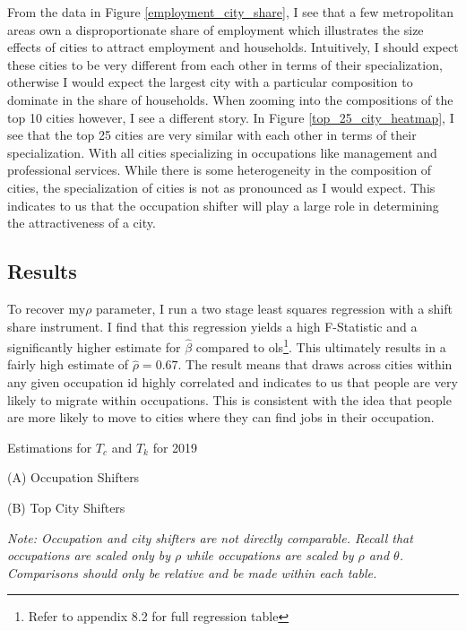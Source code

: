 \documentclass[10pt]{article}
\begin{document}
From the data in Figure \ref{employment_city_share}, I see that a few metropolitan areas own a disproportionate share of employment which illustrates the size effects of cities to attract employment and households. Intuitively, I should expect these cities to be very different from each other in terms of their specialization, otherwise I would expect the largest city with a particular composition to dominate in the share of households. When zooming into the compositions of the top 10 cities however, I see a different story. In Figure \ref{top_25_city_heatmap}, I see that the top 25 cities are very similar with each other in terms of their specialization. With all cities specializing in occupations like management and professional services. While there is some heterogeneity in the composition of cities, the specialization of cities is not as pronounced as I would expect. This indicates to us that the occupation shifter will play a large role in determining the attractiveness of a city.

\subsection{Results}

To recover my$\rho$ parameter, I run a two stage least squares regression with a shift share instrument. I find that this regression yields a high F-Statistic and a significantly higher estimate for $\hat{\beta}$ compared to ols\footnote{Refer to appendix 8.2 for full regression table}. This ultimately results in a fairly high estimate of $\hat{\rho} = 0.67$. The result means that draws across cities within any given occupation id highly correlated and indicates to us that people are very likely to migrate within occupations. This is consistent with the idea that people are more likely to move to cities where they can find jobs in their occupation.

\begin{table}[!htb]
    \centering
    \caption{Estimations for $T_c$ and $T_k$ for 2019}
    \begin{minipage}{0.4\textwidth}
        \centering
        \caption*{(A) Occupation Shifters}
        
    \end{minipage}
    \hfill
    \begin{minipage}{0.55\textwidth}
        \centering
        \caption*{(B) Top City Shifters}
        
    \end{minipage}
    \caption*{\small\textit{Note: Occupation and city shifters are not directly comparable. Recall that occupations are scaled only by $\rho$ while occupations are scaled by $\rho$ and $\theta$. Comparisons should only be relative and be made within each table.}}
\end{table}
\end{document}

